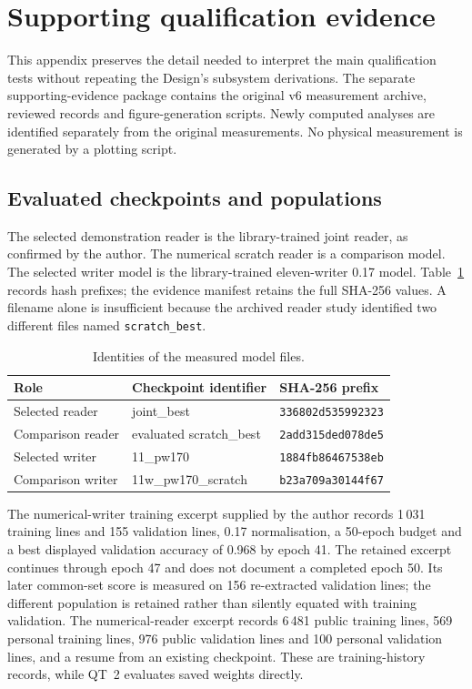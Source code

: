 \section{Supporting qualification evidence}
\label{app:res-evidence}
This appendix preserves the detail needed to interpret the main qualification tests without repeating the Design's subsystem derivations. The separate supporting-evidence package contains the original v6 measurement archive, reviewed records and figure-generation scripts. Newly computed analyses are identified separately from the original measurements. No physical measurement is generated by a plotting script.

\subsection{Evaluated checkpoints and populations}
The selected demonstration reader is the library-trained joint reader, as confirmed by the author. The numerical scratch reader is a comparison model. The selected writer model is the library-trained eleven-writer 0.17 model. Table~\ref{tab:app-checkpoints} records hash prefixes; the evidence manifest retains the full SHA-256 values. A filename alone is insufficient because the archived reader study identified two different files named \texttt{scratch\_best}.

\begin{table}[!htbp]\centering\small
\begin{tabular}{lll}\toprule
\textbf{Role} & \textbf{Checkpoint identifier} & \textbf{SHA-256 prefix}\\\midrule
Selected reader & joint\_best & \texttt{336802d535992323}\\
Comparison reader & evaluated scratch\_best & \texttt{2add315ded078de5}\\
Selected writer & 11\_pw170 & \texttt{1884fb86467538eb}\\
Comparison writer & 11w\_pw170\_scratch & \texttt{b23a709a30144f67}\\\bottomrule
\end{tabular}
\caption{Identities of the measured model files.}\label{tab:app-checkpoints}\end{table}

The numerical-writer training excerpt supplied by the author records 1\,031 training lines and 155 validation lines, 0.17 normalisation, a 50-epoch budget and a best displayed validation accuracy of 0.968 by epoch 41. The retained excerpt continues through epoch 47 and does not document a completed epoch 50. Its later common-set score is measured on 156 re-extracted validation lines; the different population is retained rather than silently equated with training validation. The numerical-reader excerpt records 6\,481 public training lines, 569 personal training lines, 976 public validation lines and 100 personal validation lines, and a resume from an existing checkpoint. These are training-history records, while QT~2 evaluates saved weights directly.

